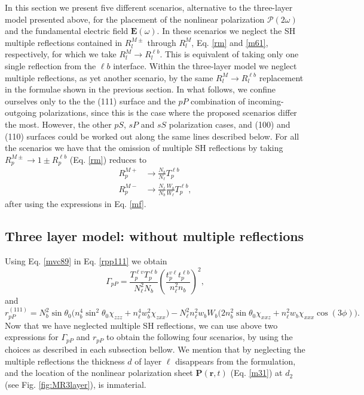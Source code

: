 In this section we present five different scenarios, alternative to the
three-layer model presented above, for the placement of the nonlinear
polarization $\boldsymbol{\mathcal{P}}(2\omega)$ and the fundamental
electric field $\mathbf{E}(\omega)$. In these scenarios we neglect the SH
multiple reflections contained in $R^{M\pm}_{l}$ through $R^{M}_{l}$, Eq.
\eqref{rm} and \eqref{m61}, respectively, for which we take $R^{M}_{l}\to
R^{\ell b}_{l}$. This is equivalent of taking only one single reflection from
the $\ell b$ interface. Within the three-layer model we neglect multiple
reflections, as yet another scenario, by the same $R^{M}_{l}\to R^{\ell b}_{l}$
replacement in the formulae shown in the previous section. In what follows, we
confine ourselves only to the the (111) surface and the $pP$ combination of
incoming-outgoing polarizations, since this is the case where the proposed
scenarios differ the most. However, the other $pS$, $sP$ and $sS$ polarization
cases, and (100) and (110) surfaces could be worked out along the same lines
described below. For all the scenarios we have that the omission of multiple SH
reflections by taking $R^{M\pm}_{p}\to 1\pm R^{\ell b}_{p}$ (Eq. \eqref{rm})
reduces to
\begin{align}\label{mvc89}
R^{M+}_{p}&\to\frac{N_{b}}{N_{\ell}}T^{\ell b}_{p}\nonumber\\
R^{M-}_{p}&\to\frac{N_{\ell}}{N_{b}}\frac{W_{b}}{W_{\ell}}T^{\ell b}_{p},
\end{align}
after using the expressions in Eq. \eqref{mf}.



\subsection{Three layer model: without multiple reflections}\label{sec:nomr}

Using Eq. \eqref{mvc89} in Eq. \eqref{rpp111} we obtain
\begin{equation}\label{m79}
\Gamma_{pP}=
\frac{T_{p}^{\ell v}T^{\ell b}_{p}}
     {N^{2}_{\ell}N_{b}}
\left(
\frac{t_{p}^{v\ell}t^{\ell b}_{p}}
     {n^{2}_{\ell}n_{b}}
\right)^{2},  
\end{equation}
and
\begin{equation}\label{m81}
r^{(111)}_{pP} =
N^{2}_{b}\sin\theta_{0}
\Big(
  n^{4}_{b}\sin^2\theta_{0}\chi_{zzz}
+ n^{4}_{\ell}w^2_{b}\chi_{zxx}
\Big)
- N^{2}_{\ell}n^{2}_{\ell}w_{b}W_{b}
\Big(
  2n^{2}_{b}\sin\theta_{0}\chi_{xxz}
+ n^{2}_{\ell}w_{b}\chi_{xxx}\cos(3\phi) 
\Big).
\end{equation}
Now that we have neglected multiple SH reflections, we can use above two
expressions for $\Gamma_{pP}$ and $r_{pP}$ to obtain the following four
scenarios, by using the choices as described in each subsection bellow. We
mention that by neglecting the multiple reflections the thickness $d$ of layer
$\ell$ disappears from the formulation, and the location of the nonlinear
polarization sheet $\mathbf{P}(\mathbf{r},t)$ (Eq. \eqref{m31}) at 
$d_{2}$ (see Fig. \ref{fig:MR3layer}), is inmaterial.

